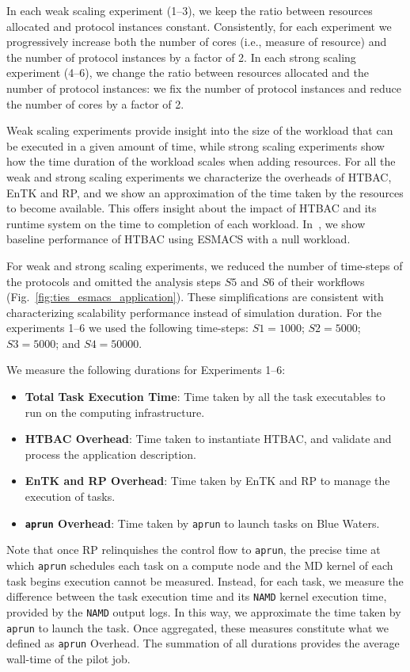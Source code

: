 In each weak scaling experiment (1--3), we keep the ratio between resources
allocated and protocol instances constant. Consistently, for each experiment
we progressively increase both the number of cores (i.e., measure of
resource) and the number of protocol instances by a factor of 2. In each
strong scaling experiment (4--6), we change the ratio between resources
allocated and the number of protocol instances: we fix the number of protocol
instances and reduce the number of cores by a factor of 2.

Weak scaling experiments provide insight into the size of the workload that
can be executed in a given amount of time, while strong scaling experiments
show how the time duration of the workload scales when adding resources. For
all the weak and strong scaling experiments we characterize the overheads of
HTBAC, EnTK and RP, and we show an approximation of the time taken by the
resources to become available. This offers insight about the impact of HTBAC
and its runtime system on the time to completion of each workload.
In~\cite{dakka2017}, we show baseline performance of HTBAC using ESMACS with
a null workload.

For weak and strong scaling experiments, we reduced the number of time-steps
of the protocols and omitted the analysis steps $S5$ and $S6$ of their
workflows (Fig.~\ref{fig:ties_esmacs_application}). These simplifications are
consistent with characterizing scalability performance instead of simulation
duration. For the experiments 1--6 we used the following time-steps:
$S1=1000$; $S2=5000$; $S3=5000$; and $S4=50000$.

We measure the following durations for Experiments 1--6:
\begin{itemize}
    \item \textbf{Total Task Execution Time}: Time taken by all the task
    executables to run on the computing infrastructure.
    \item \textbf{HTBAC Overhead}: Time taken to instantiate HTBAC, and
    validate and process the application description.
    \item \textbf{EnTK and RP Overhead}: Time taken by EnTK and RP to manage
    the execution of tasks.
    \item \textbf{\texttt{aprun} Overhead}: Time taken by \texttt{aprun} to
    launch tasks on Blue Waters.
\end{itemize}

Note that once RP relinquishes the control flow to \texttt{aprun}, the
precise time at which \texttt{aprun} schedules each task on a compute node
and the MD kernel of each task begins execution cannot be measured. Instead,
for each task, we measure the difference between the task execution time and
its \texttt{NAMD} kernel execution time, provided by the \texttt{NAMD} output
logs. In this way, we approximate the time taken by \texttt{aprun} to launch
the task. Once aggregated, these measures constitute what we defined as
\texttt{aprun} Overhead. The summation of all durations provides the average
wall-time of the pilot job.

